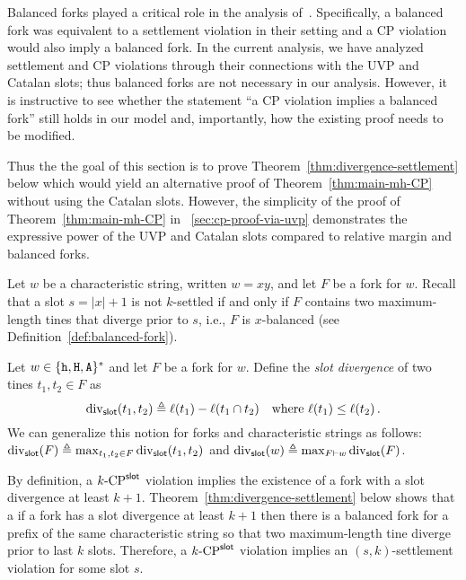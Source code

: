 Balanced forks played a critical role 
in the analysis of~\cite{LinearConsistency}. 
Specifically, a balanced fork was equivalent to a settlement violation in their setting 
and a CP violation would also imply a balanced fork.
In the current analysis, 
we have analyzed settlement and CP violations through 
their connections with the UVP and Catalan slots; 
thus balanced forks are not necessary in our analysis. 
However, it is instructive to see 
whether the statement ``a CP violation implies a balanced fork'' 
still holds in our model 
and, importantly, 
how the existing proof needs to be modified. 

Thus the the goal of this section is to prove 
Theorem~\ref{thm:divergence-settlement} below which 
would yield an alternative proof of Theorem~\ref{thm:main-mh-CP} 
without using the Catalan slots.
However, the simplicity of the proof of Theorem~\ref{thm:main-mh-CP} 
in \Section~\ref{sec:cp-proof-via-uvp} 
demonstrates the expressive power of the UVP and Catalan slots 
compared to relative margin and balanced forks.



Let $w$ be a characteristic string, written $w = xy$, 
and let $F$ be a fork for $w$. 
Recall that a slot $s = |x| + 1$ is not $k$-settled 
if and only if $F$ contains 
two maximum-length tines that diverge prior to $s$, 
i.e., $F$ is $x$-balanced (see Definition~\ref{def:balanced-fork}).


\begin{definition}\label{def:slot-divergence}
  Let $w \in \{\mathtt{h}, \mathtt{H}, \mathtt{A}\}^*$ and let $F$ be a fork for $w$. 
  Define the \emph{slot divergence} of 
  two tines $t_1, t_2 \in F$ 
  as 
  \begin{equation}\label{eq:slot-divergence-tines}
    \mathrm{div}_{\mathsf{slot}}(t_1, t_2) \triangleq \ell(t_1) - \ell(t_1 \cap t_2)
    \quad\text{where $\ell(t_1) \leq \ell(t_2)$}
    \,.
  \end{equation}
  We can generalize this notion for forks and characteristic strings as follows: 
  $\mathrm{div}_{\mathsf{slot}}(F) \triangleq \max_{t_1, t_2 \in F} \mathrm{div}_{\mathsf{slot}}(t_1, t_2)$ and 
  $\mathrm{div}_{\mathsf{slot}}(w) \triangleq \max_{F \vdash w} \mathrm{div}_{\mathsf{slot}}(F)$. 
\end{definition}

By definition, a ${k}\text{-}\mathrm{CP}^{\mathsf{slot}}$ violation 
implies the existence of a fork with a slot divergence at least $k + 1$. 
Theorem~\ref{thm:divergence-settlement} below 
shows that a if a fork has a slot divergence at least $k+1$ then 
there is a balanced fork for a prefix of the same characteristic string so that 
two maximum-length tine diverge prior to last $k$ slots. 
Therefore, a ${k}\text{-}\mathrm{CP}^{\mathsf{slot}}$ violation implies an $(s,k)$-settlement violation 
for some slot $s$.



